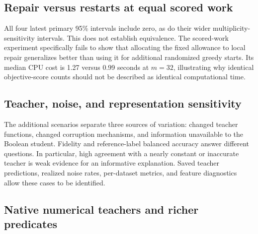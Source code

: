 \documentclass[a4paper,fleqn,review]{cas-sc}
\begin{document}
\subsection{Repair versus restarts at equal scored work}\label{sec:work-results}



All four latest primary 95\% intervals include zero, as do their wider multiplicity-sensitivity intervals. This does not establish equivalence. The scored-work experiment specifically fails to show that allocating the fixed allowance to local repair generalizes better than using it for additional randomized greedy starts. Its median CPU cost is 1.27 versus 0.99 seconds at $m=32$, illustrating why identical objective-score counts should not be described as identical computational time.


\subsection{Teacher, noise, and representation sensitivity}


The additional scenarios separate three sources of variation: changed teacher functions, changed corruption mechanisms, and information unavailable to the Boolean student. Fidelity and reference-label balanced accuracy answer different questions. In particular, high agreement with a nearly constant or inaccurate teacher is weak evidence for an informative explanation. Saved teacher predictions, realized noise rates, per-dataset metrics, and feature diagnostics allow these cases to be identified.


\subsection{Native numerical teachers and richer predicates}\label{sec:native-followup}



\end{document}
